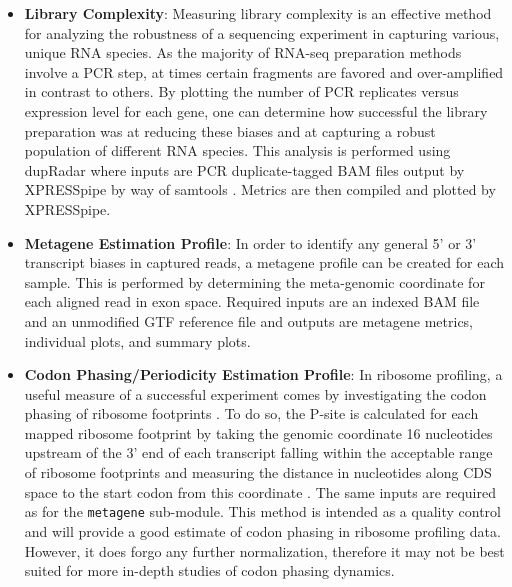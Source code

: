 \documentclass[11pt, a4paper, oneside]{article}
\begin{document}
\begin{enumerate}
\begin{itemize}
      \item \textbf{Library Complexity}: Measuring library complexity is an effective method for analyzing the robustness of a sequencing experiment in capturing various, unique RNA species. As the majority of RNA-seq preparation methods involve a PCR step, at times certain fragments are favored and over-amplified in contrast to others. By plotting the number of PCR replicates versus expression level for each gene, one can determine how successful the library preparation was at reducing these biases and at capturing a robust population of different RNA species. This analysis is performed using dupRadar \cite{dupradar} where inputs are PCR duplicate-tagged BAM files output by XPRESSpipe by way of samtools \cite{samtools}. Metrics are then compiled and plotted by XPRESSpipe.

      \item \textbf{Metagene Estimation Profile}: In order to identify any general 5' or 3' transcript biases in captured reads, a metagene profile can be created for each sample. This is performed by determining the meta-genomic coordinate for each aligned read in exon space. Required inputs are an indexed BAM file and an unmodified GTF reference file and outputs are metagene metrics, individual plots, and summary plots.

      \item \textbf{Codon Phasing/Periodicity Estimation Profile}: In ribosome profiling, a useful measure of a successful experiment comes by investigating the codon phasing of ribosome footprints \cite{ingolia_meth}. To do so, the P-site is calculated for each mapped ribosome footprint by taking the genomic coordinate 16 nucleotides upstream of the 3' end of each transcript falling within the acceptable range of ribosome footprints and measuring the distance in nucleotides along CDS space to the start codon from this coordinate \cite{ribowaltz}. The same inputs are required as for the \texttt{metagene} sub-module. This method is intended as a quality control and will provide a good estimate of codon phasing in ribosome profiling data. However, it does forgo any further normalization, therefore it may not be best suited for more in-depth studies of codon phasing dynamics.


\end{itemize}
\end{enumerate}
\end{document}
